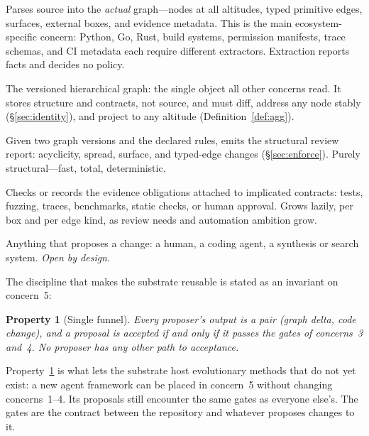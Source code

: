 \documentclass[sigconf,review,anonymous]{acmart}
\theoremstyle{plain}
\newtheorem{property}[theorem]{Property}
\theoremstyle{definition}
\begin{document}
\begin{description}[leftmargin=*,itemsep=2pt,topsep=2pt,style=nextline]
\item[\textsf{1.\ Extraction} (language $\to$ graph)] Parses source into the
\emph{actual} graph---nodes at all altitudes, typed primitive edges, surfaces,
external boxes, and evidence metadata. This is the main ecosystem-specific
concern: Python, Go, Rust, build systems, permission manifests, trace schemas,
and CI metadata each require different extractors. Extraction reports facts and
decides no policy.
\item[\textsf{2.\ Representation} (the artifact)] The versioned hierarchical
graph: the single object all other concerns read. It stores structure and
contracts, not source, and must diff, address any node stably
(\S\ref{sec:identity}), and project to any altitude (Definition~\ref{def:agg}).
\item[\textsf{3.\ Conformance} (structural gate)] Given two graph versions and
the declared rules, emits the structural review report: acyclicity, spread,
surface, and typed-edge changes (\S\ref{sec:enforce}). Purely structural---fast,
total, deterministic.
\item[\textsf{4.\ Evidence} (contract gate)] Checks or records the evidence
obligations attached to implicated contracts: tests, fuzzing, traces,
benchmarks, static checks, or human approval. Grows lazily, per box and per
edge kind, as review needs and automation ambition grow.
\item[\textsf{5.\ Evolution} (proposers)] Anything that proposes a change: a
human, a coding agent, a synthesis or search system. \emph{Open by design.}
\end{description}

The discipline that makes the substrate reusable is stated as an invariant on
concern~5:

\begin{property}[Single funnel]\label{prop:funnel}
Every proposer's output is a pair (graph delta, code change), and a proposal is
accepted if and only if it passes the gates of concerns~3 and~4. No proposer
has any other path to acceptance.
\end{property}

\noindent
Property~\ref{prop:funnel} is what lets the substrate host evolutionary methods
that do not yet exist: a new agent framework can be placed in concern~5 without
changing concerns~1--4. Its proposals still encounter the same gates as
everyone else's. The gates are the contract between the repository and whatever
proposes changes to it.
\end{document}
